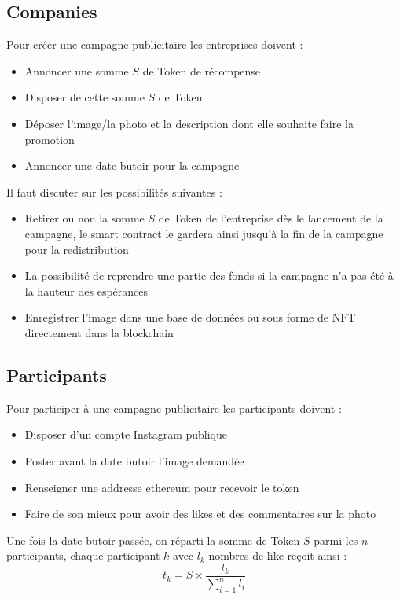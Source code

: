\documentclass[10pt]{article}
\begin{document}
\subsection{Companies}
Pour créer une campagne publicitaire les entreprises doivent :
\begin{itemize}
  \item Annoncer une somme $S$ de Token de récompense
  \item Disposer de cette somme $S$ de Token
  \item Déposer l'image/la photo et la description dont elle souhaite faire la promotion
  \item Annoncer une date butoir pour la campagne
\end{itemize}
Il faut discuter sur les possibilités suivantes :
\begin{itemize}
  \item Retirer ou non la somme $S$ de Token de l'entreprise dès le lancement de la campagne, le smart contract le gardera ainsi jusqu'à la fin de la campagne pour la redistribution
  \item La possibilité de reprendre une partie des fonds si la campagne n'a pas été à la hauteur des espérances
  \item Enregistrer l'image dans une base de données ou sous forme de NFT directement dans la blockchain
\end{itemize}

\subsection{Participants}
Pour participer à une campagne publicitaire les participants doivent :
\begin{itemize}
  \item Disposer d'un compte Instagram publique
  \item Poster avant la date butoir l'image demandée
  \item Renseigner une addresse ethereum pour recevoir le token
  \item Faire de son mieux pour avoir des likes et des commentaires sur la photo
\end{itemize}
Une fois la date butoir passée, on réparti la somme de Token $S$ parmi les $n$ participants, chaque participant $k$ avec $l_k$ nombres de like reçoit ainsi :
\begin{equation}
t_k = S \times \frac{l_k}{\sum_{i=1}^{n}{l_i}}
\end{equation}
\end{document}
